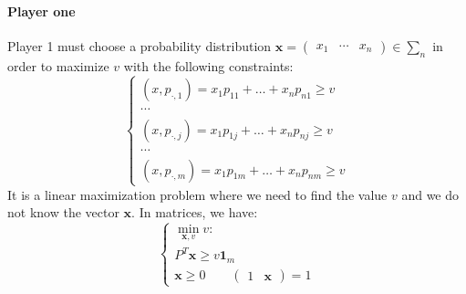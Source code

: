 \paragraph*{Player one}
Player 1 must choose a probability distribution $\mathbf{x}=\begin{pmatrix} x_1 & \cdots & x_n \end{pmatrix} \in \sum_n$ in order to maximize $v$ with the following constraints: 
\[\begin{cases}
    (x,p_{\cdot,1})=x_1p_{11}+\dots+x_np_{n1}\geq v \\
    \cdots \\
    (x,p_{\cdot,j})=x_1p_{1j}+\dots+x_np_{nj}\geq v \\
    \cdots \\
    (x,p_{\cdot,m})=x_1p_{1m}+\dots+x_np_{nm}\geq v
\end{cases}\]
It is a linear maximization problem where we need to find the value $v$ and we do not know the vector $\mathbf{x}$.
In matrices, we have: 
\[\begin{cases}
    \min_{\mathbf{x},v}v: \\
    P^T\mathbf{x} \geq v\mathbf{1}_{m} \\
    \mathbf{x}\geq 0 \qquad \begin{pmatrix} 1 & \mathbf{x} \end{pmatrix} = 1
\end{cases}\]

